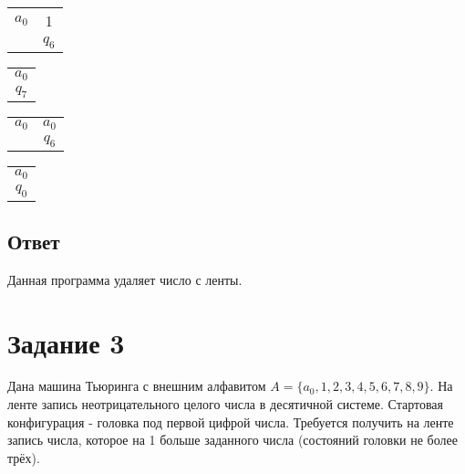 \documentclass[14pt, a4paper]{article}
\begin{document}
    \begin{center}
        \begin{tabular}{ | c c | }
            \hline
            $a_0$ & 1 \\
            & $q_6$ \\
            \hline
        \end{tabular}
    \end{center}
    
    \begin{center}
        \begin{tabular}{ | c | }
            \hline
            $a_0$ \\
            $q_7$ \\
            \hline
        \end{tabular}
    \end{center}
    
    \begin{center}
        \begin{tabular}{ | c c | }
            \hline
            $a_0$ & $a_0$ \\
            & $q_6$ \\
            \hline
        \end{tabular}
    \end{center}
    
    \begin{center}
        \begin{tabular}{ | c | }
            \hline
            $a_0$ \\
            $q_0$ \\
            \hline
        \end{tabular}
    \end{center}

    \subsection*{Ответ}
    Данная программа удаляет число с ленты.

    \vspace{1cm}
    \section*{Задание 3}
    Дана машина Тьюринга с внешним алфавитом $A = \{a_0, 1, 2, 3, 4, 5, 6, 7, 8, 9\}$. На ленте запись неотрицательного целого числа в десятичной системе. Стартовая конфигурация - головка под первой цифрой числа. Требуется получить на ленте запись числа, которое на 1 больше заданного числа (состояний головки не более трёх).
\end{document}
